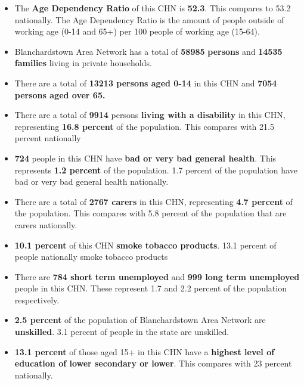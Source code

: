 \documentclass{article}
\begin{document}
\begin{itemize}

\item The \textbf{Age Dependency Ratio} of this CHN is  \textbf{52.3}. This compares to 53.2 nationally. The Age Dependency Ratio is the amount of people outside of working age (0-14 and 65+) per 100 people of working age (15-64). 

\item Blanchardstown Area Network has a total of \textbf{\num{58985}} \textbf{persons} and  \textbf{\num{14535}} \textbf{families} living in private households.

\item There are a total of \textbf{\num{13213} persons aged 0-14} in this CHN and \textbf{\num{7054} persons aged over 65.} 

\item There are a total of \textbf{\num{9914}} persons \textbf{living with a disability} in this CHN, representing \textbf{16.8 percent} of the population. This compares with  21.5 percent nationally

\item \textbf{\num{724}} people in this CHN have \textbf{bad or very bad general health}. This represents \textbf{1.2 percent} of the population. 1.7 percent of the population have bad or very bad general health nationally. 

\item There are a total of \textbf{\num{2767} carers} in this CHN, representing \textbf{4.7 percent} of the population. This compares with 5.8 percent of the population that are carers nationally. 

\item \textbf{10.1 percent} of this CHN \textbf{smoke tobacco products}. 13.1 percent of people nationally smoke tobacco products

\item There are \textbf{\num{784} short term unemployed} and \textbf{\num{999} long term unemployed} people in this CHN. These represent 1.7 and 2.2 percent of the population respectively.

\item  \textbf{2.5 percent} of the population of Blanchardstown Area Network are \textbf{unskilled}. 3.1 percent of people in the state are unskilled.

\item \textbf{13.1 percent} of those aged 15+ in this CHN have a \textbf{highest level of education of lower secondary or lower}. This compares with 23 percent nationally. 


\end{itemize}
\end{document}
